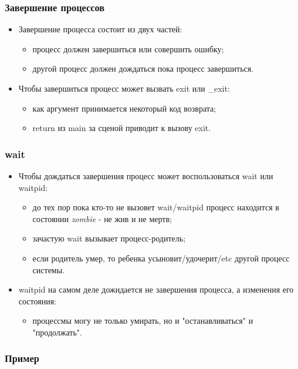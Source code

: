 \begin{frame}
\frametitle{Завершение процессов}
\begin{itemize}
  \item Завершение процесса состоит из двух частей:
  \begin{itemize}
    \item процесс должен завершиться или совершить ошибку;
    \item другой процесс должен дождаться пока процесс завершиться.
  \end{itemize}
  \item Чтобы завершиться процесс может вызвать exit или \_exit:
  \begin{itemize}
    \item как аргумент принимается некоторый код возврата;
    \item return из main за сценой приводит к вызову exit.
  \end{itemize}
\end{itemize}
\end{frame}

\begin{frame}
\frametitle{wait}
\begin{itemize}
  \item Чтобы дождаться завершения процесс может воспользоваться wait или
  waitpid:
  \begin{itemize}
    \item до тех пор пока кто-то не вызовет wait/waitpid процесс находится в
    состоянии \emph{zombie} - не жив и не мертв;
    \item зачастую wait вызывает процесс-родитель;
    \item если родитель умер, то ребенка усыновит/удочерит/etc другой процесс
    системы.
  \end{itemize}
  \item waitpid на самом деле дожидается не завершения процесса, а изменения его
  состояния:
  \begin{itemize}
    \item процессмы могу не только умирать, но и "останавливаться" и
    "продолжать".
  \end{itemize}
\end{itemize}
\end{frame}

\begin{frame}[fragile]
\frametitle{Пример}

\end{frame}
